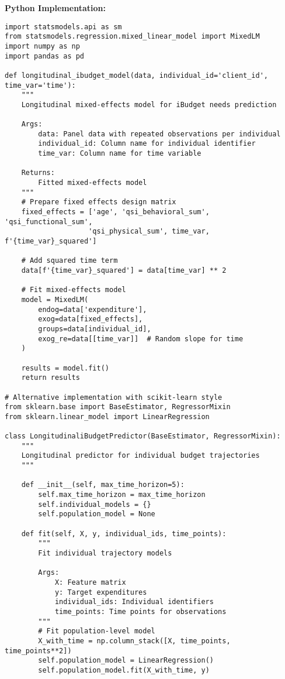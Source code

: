 \documentclass[12pt]{article}
\begin{document}
\textbf{Python Implementation:}
\begin{lstlisting}
import statsmodels.api as sm
from statsmodels.regression.mixed_linear_model import MixedLM
import numpy as np
import pandas as pd

def longitudinal_ibudget_model(data, individual_id='client_id', time_var='time'):
    """
    Longitudinal mixed-effects model for iBudget needs prediction
    
    Args:
        data: Panel data with repeated observations per individual
        individual_id: Column name for individual identifier
        time_var: Column name for time variable
    
    Returns:
        Fitted mixed-effects model
    """
    # Prepare fixed effects design matrix
    fixed_effects = ['age', 'qsi_behavioral_sum', 'qsi_functional_sum', 
                    'qsi_physical_sum', time_var, f'{time_var}_squared']
    
    # Add squared time term
    data[f'{time_var}_squared'] = data[time_var] ** 2
    
    # Fit mixed-effects model
    model = MixedLM(
        endog=data['expenditure'],
        exog=data[fixed_effects],
        groups=data[individual_id],
        exog_re=data[[time_var]]  # Random slope for time
    )
    
    results = model.fit()
    return results

# Alternative implementation with scikit-learn style
from sklearn.base import BaseEstimator, RegressorMixin
from sklearn.linear_model import LinearRegression

class LongitudinaliBudgetPredictor(BaseEstimator, RegressorMixin):
    """
    Longitudinal predictor for individual budget trajectories
    """
    
    def __init__(self, max_time_horizon=5):
        self.max_time_horizon = max_time_horizon
        self.individual_models = {}
        self.population_model = None
        
    def fit(self, X, y, individual_ids, time_points):
        """
        Fit individual trajectory models
        
        Args:
            X: Feature matrix
            y: Target expenditures
            individual_ids: Individual identifiers
            time_points: Time points for observations
        """
        # Fit population-level model
        X_with_time = np.column_stack([X, time_points, time_points**2])
        self.population_model = LinearRegression()
        self.population_model.fit(X_with_time, y)
        

\end{lstlisting}
\end{document}
